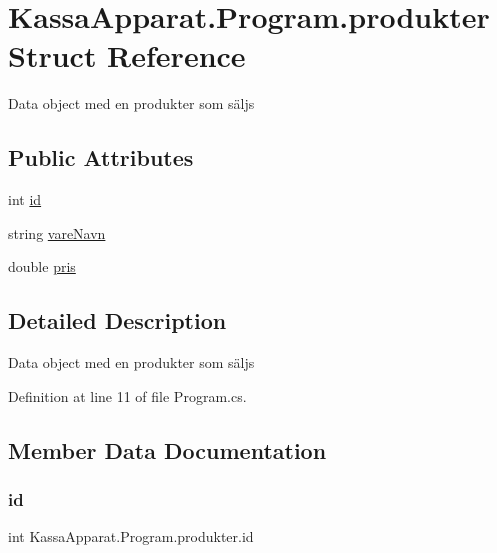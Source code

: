 \hypertarget{struct_kassa_apparat_1_1_program_1_1produkter}{}\section{Kassa\+Apparat.\+Program.\+produkter Struct Reference}
\label{struct_kassa_apparat_1_1_program_1_1produkter}


Data object med en produkter som säljs  


\subsection*{Public Attributes}
\begin{DoxyCompactItemize}
\item 
int \mbox{\hyperlink{struct_kassa_apparat_1_1_program_1_1produkter_a83eaaa15c566efb93488fe8f0664c692}{id}}
\item 
string \mbox{\hyperlink{struct_kassa_apparat_1_1_program_1_1produkter_a9dc9c2ffa906222a254b65ceb0c12871}{vare\+Navn}}
\item 
double \mbox{\hyperlink{struct_kassa_apparat_1_1_program_1_1produkter_a52e27014a762549fe7991ae38b053d66}{pris}}
\end{DoxyCompactItemize}


\subsection{Detailed Description}
Data object med en produkter som säljs 



Definition at line 11 of file Program.\+cs.



\subsection{Member Data Documentation}
\mbox{\label{struct_kassa_apparat_1_1_program_1_1produkter_a83eaaa15c566efb93488fe8f0664c692}} 
\subsubsection{\texorpdfstring{id}{id}}
{\footnotesize\ttfamily int Kassa\+Apparat.\+Program.\+produkter.\+id}



